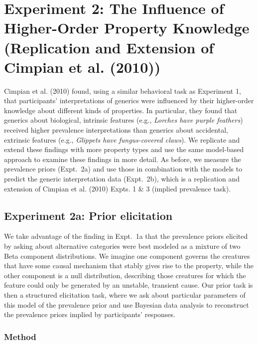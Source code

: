 \documentclass[floatsintext,man]{apa6}
\begin{document}
\hypertarget{preliminary-study-replication-and-extension-of-cimpian-et-al.-2010}{%
\section{Experiment 2: The Influence of Higher-Order Property Knowledge (Replication and Extension of Cimpian et al. (2010))}\label{preliminary-study-replication-and-extension-of-cimpian-et-al.-2010}}

Cimpian et al. (2010) found, using a similar behavioral task as Experiment 1, that participants' interpretations of generics were influenced by their higher-order knowledge about different kinds of properties. 
In particular, they found that generics about biological, intrinsic features (e.g., \emph{Lorches have purple feathers}) received higher prevalence interpretations than generics about accidental, extrinsic features (e.g., \emph{Glippets have fungus-covered claws}). 
We replicate and extend these findings with more property types and use the same model-based approach to examine these findings in more detail. As before, we measure the prevalence priors (Expt.~2a) and use those in combination with the models to predict the generic interpretation data (Expt.~2b), which is a replication and extension of Cimpian et al. (2010) Expts. 1 \& 3 (implied prevalence task). 

\subsection{Experiment 2a: Prior elicitation}

We take advantage of the finding in Expt.~1a that the prevalence priors elicited by asking about alternative categories were best modeled as a mixture of two Beta component distributions. 
We imagine one component governs the creatures that have some causal mechanism that stably gives rise to the property, while the other component is a null distribution, describing those creatures for which the feature could only be generated by an unstable, transient cause. 
Our prior task is then a structured elicitation task, where we ask about particular parameters of this model of the prevalence prior and use Bayesian data analysis to reconstruct the prevalence priors implied by participants' responses. 


\subsubsection{Method}\label{method}
\end{document}
